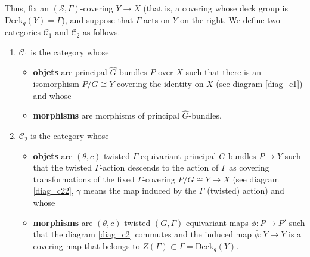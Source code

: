 Thus, fix an \((\mathcal{S},\Gamma)\)-covering \(Y \to X\) (that is, a covering whose deck group is \(\mathrm{Deck}_q(Y)=\Gamma\)), and suppose that \(\Gamma\) acts on \(Y\) on the right. We define two categories \(\mathcal{C}_1\) and \(\mathcal{C}_2\) as follows.
\begin{enumerate}
    \item \(\mathcal{C}_1\) is the category whose
    \begin{itemize}
        \item \textbf{objets} are principal \(\hat{G}\)-bundles \(P\) over \(X\) such that there is an isomorphism \(P/G\cong Y\) covering the identity on \(X\) (see diagram \ref{diag_c1}) and whose
        \item \textbf{morphisms} are morphisms of principal \(\hat{G}\)-bundles.
    \end{itemize}
    \item \(\mathcal{C}_2\) is the category whose
    \begin{itemize}
        \item \textbf{objets} are \((\theta, c)\)-twisted \(\Gamma\)-equivariant principal \(G\)-bundles \(P \to Y\) such that the twisted \(\Gamma\)-action descends to the action of \(\Gamma\) as covering transformations of the fixed \(\Gamma\)-covering \(P/G\cong Y\to X\) (see diagram \ref{diag_c22}, \(\gamma\) means the map induced by the \(\Gamma\) (twisted) action) and whose
        \item \textbf{morphisms} are \((\theta,c)\)-twisted \((G, \Gamma)\)-equivariant maps \(\phi\colon P \to P'\) such that the diagram \ref{diag_c2} commutes and the induced map \(\bar{\phi}\colon Y \to Y\) is a covering map that belongs to \(Z(\Gamma)\subset \Gamma=\mathrm{Deck}_q(Y)\).
    \end{itemize}
\end{enumerate}

